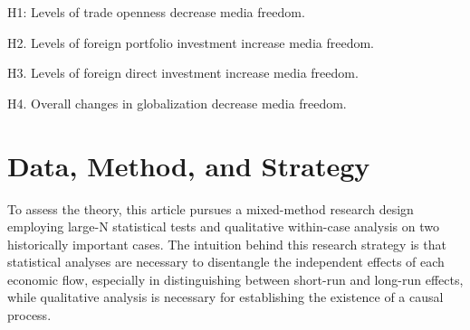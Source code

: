 \documentclass[12pt,a4paper]{article}\usepackage[]{graphicx}\usepackage[]{color}
\begin{document}
H1: Levels of trade openness decrease media freedom.

H2. Levels of foreign portfolio investment increase media freedom.

H3. Levels of foreign direct investment increase media freedom.

H4. Overall changes in globalization decrease media freedom.

\section{Data, Method, and Strategy}

To assess the theory, this article pursues a mixed-method research design employing large-N statistical tests and qualitative within-case analysis on two historically important cases. The intuition behind this research strategy is that statistical analyses are necessary to disentangle the independent effects of each economic flow, especially in distinguishing between short-run and long-run effects, while qualitative analysis is necessary for establishing the existence of a causal process.
\end{document}
